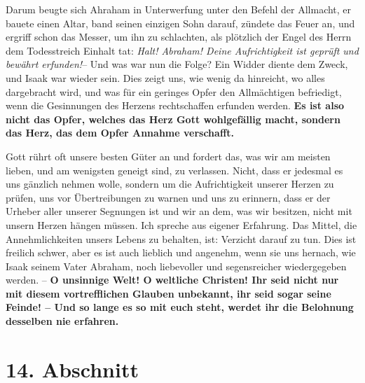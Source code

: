 Darum beugte sich Ahraham in Unterwerfung unter den Befehl der Allmacht,
 er
bauete einen Altar, band seinen einzigen Sohn darauf, zündete das Feuer an, und
ergriff schon das Messer, um ihn zu schlachten, als plötzlich der Engel des
Herrn dem Todesstreich Einhalt tat: \textit{Halt! Abraham! Deine Aufrichtigkeit
ist
geprüft und bewährt erfunden!}-- Und was war nun die Folge? Ein Widder diente
dem Zweck, und Isaak war wieder sein. Dies zeigt uns, wie wenig da
hinreicht, wo alles dargebracht wird, und was für ein geringes Opfer den
Allmächtigen befriedigt, wenn die Gesinnungen des Herzens rechtschaffen erfunden
werden. \textbf{Es ist also nicht das Opfer, welches das Herz Gott wohlgefällig
macht,
sondern das Herz, das dem Opfer Annahme verschafft.} 

\medskip

Gott rührt oft unsere besten Güter an und fordert das, was wir am meisten
lieben, und am wenigsten geneigt sind, zu verlassen. Nicht, dass er jedesmal es
uns gänzlich nehmen wolle, sondern um die Aufrichtigkeit unserer Herzen zu
prüfen, uns vor Übertreibungen zu warnen und uns zu erinnern, dass er der
Urheber aller unserer Segnungen ist und wir an dem, was wir besitzen, nicht mit
unsern Herzen hängen müssen. Ich spreche aus eigener Erfahrung. Das Mittel, die
Annehmlichkeiten unsers Lebens zu behalten, ist: Verzicht darauf zu tun. Dies
ist freilich schwer, aber es ist auch lieblich und angenehm, wenn sie uns
hernach, wie Isaak seinem Vater Abraham, noch liebevoller und
segensreicher wiedergegeben werden. -- \textbf{O unsinnige Welt! O weltliche
Christen!
Ihr seid nicht nur mit diesem vortrefflichen Glauben unbekannt, ihr seid sogar
seine Feinde! -- Und so lange es so mit euch steht, werdet ihr die Belohnung
desselben nie erfahren.}

\section{14. Abschnitt} \label{kap4_ab14}

